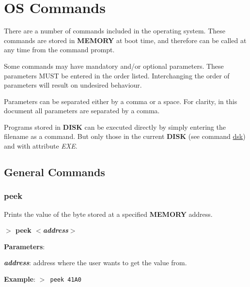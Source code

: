 \section{OS Commands}
There are a number of commands included in the operating system. These
commands are stored in \textbf{MEMORY} at boot time, and therefore can be
called at any time from the command prompt.

Some commands may have mandatory and/or optional parameters. These
parameters MUST be entered in the order listed. Interchanging the order of
parameters will result on undesired behaviour.

Parameters can be separated either by a comma or a space. For clarity, in
this document all parameters are separated by a comma.

Programs stored in \textbf{DISK} can be executed directly by simply entering
the filename as a command. But only those in the current \textbf{DISK} (see
command \hyperref[cmd:dsk]{dsk}) and with attribute \textit{EXE}.

    \subsection{General Commands}\label{gencmds}

        \subsubsection{{peek}}
        \label{cmd:peek}

        Prints the value of the byte stored at a specified \textbf{MEMORY}
        address.

        \hspace{1.9cm}\textbf{$>$ peek \textit{$<$address$>$}}

        \textbf{Parameters}:

        \hspace{1cm}\textbf{\textit{address}}: address where the user wants
        to get the value from.

        \textbf{Example}: \texttt{$>$ peek 41A0}

